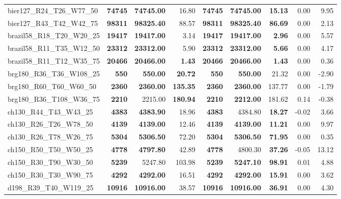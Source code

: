 \documentclass{singlecol-new}
\begin{document}
\begin{scriptsize}
\begin{longtable}{lrrrrrrrr}
		bier127\_R24\_T26\_W77\_50 & \textbf{74745} & \textbf{74745.00} & 16.80 & \textbf{74745} & \textbf{74745.00} & \textbf{15.13} & 0.00 & 9.95 \\
		bier127\_R43\_T42\_W42\_75 & \textbf{98311} & \textbf{98325.40} & 88.57 & \textbf{98311} & \textbf{98325.40} & \textbf{86.69} & 0.00 & 2.13 \\
		brazil58\_R18\_T20\_W20\_25 & \textbf{19417} & \textbf{19417.00} & 3.14 & \textbf{19417} & \textbf{19417.00} & \textbf{2.96} & 0.00 & 5.57 \\
		brazil58\_R11\_T35\_W12\_50 & \textbf{23312} & \textbf{23312.00} & 5.90 & \textbf{23312} & \textbf{23312.00} & \textbf{5.66} & 0.00 & 4.17 \\
		brazil58\_R11\_T12\_W35\_75 & \textbf{20466} & \textbf{20466.00} & \textbf{1.43} & \textbf{20466} & \textbf{20466.00} & \textbf{1.43} & 0.00 & 0.36 \\
		brg180\_R36\_T36\_W108\_25 & \textbf{550} & \textbf{550.00} & \textbf{20.72} & \textbf{550} & \textbf{550.00} & 21.32 & 0.00 & -2.90 \\
		brg180\_R60\_T60\_W60\_50 & \textbf{2360} & \textbf{2360.00} & \textbf{135.35} & \textbf{2360} & \textbf{2360.00} & 137.77 & 0.00 & -1.79 \\
		brg180\_R36\_T108\_W36\_75 & \textbf{2210} & 2215.00 & \textbf{180.94} & \textbf{2210} & \textbf{2212.00} & 181.62 & 0.14 & -0.38 \\
		ch130\_R44\_T43\_W43\_25 & \textbf{4383} & \textbf{4383.90} & 18.96 & \textbf{4383} & 4384.80 & \textbf{18.27} & -0.02 & 3.66 \\
		ch130\_R26\_T26\_W78\_50 & \textbf{4139} & \textbf{4139.00} & 12.46 & \textbf{4139} & \textbf{4139.00} & \textbf{11.21} & 0.00 & 9.97 \\
		ch130\_R26\_T78\_W26\_75 & \textbf{5304} & \textbf{5306.50} & 72.20 & \textbf{5304} & \textbf{5306.50} & \textbf{71.95} & 0.00 & 0.35 \\
		ch150\_R50\_T50\_W50\_25 & \textbf{4778} & \textbf{4797.80} & 42.89 & \textbf{4778} & 4800.30 & \textbf{37.26} & -0.05 & 13.12 \\
		ch150\_R30\_T90\_W30\_50 & \textbf{5239} & 5247.80 & 103.98 & \textbf{5239} & \textbf{5247.10} & \textbf{98.91} & 0.01 & 4.88 \\
		ch150\_R30\_T30\_W90\_75 & \textbf{4292} & \textbf{4292.00} & 16.51 & \textbf{4292} & \textbf{4292.00} & \textbf{15.91} & 0.00 & 3.62 \\
		d198\_R39\_T40\_W119\_25 & \textbf{10916} & \textbf{10916.00} & 38.57 & \textbf{10916} & \textbf{10916.00} & \textbf{36.91} & 0.00 & 4.30 \\

\end{longtable}
\end{scriptsize}
\end{document}
